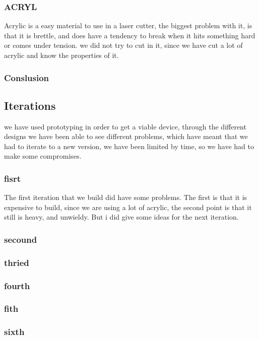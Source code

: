 \subsubsection{ACRYL}
Acrylic is a easy material to use in a laser cutter, the biggest problem with it, is that it is brettle, and does have a tendency to break when it hits something hard or comes under tension.
we did not try to cut in it, since we have cut a lot of acrylic and know the properties of it.

\subsubsection{Conslusion}

\subsection{Iterations}
we have used prototyping in order to get a viable device, through the different designs we have been able to see different problems, which have meant that we had to iterate to a new version, we have been limited by time, so we have had to make some compromises.

\subsubsection{fisrt}
The first iteration that we build did have some problems.
The first is that it is expensive to build, since we are using a lot of acrylic, the second point is that it still is heavy, and unwieldy.
But i did give some ideas for the next iteration.

\subsubsection{secound}


\subsubsection{thried}


\subsubsection{fourth}


\subsubsection{fith}

\subsubsection{sixth}

